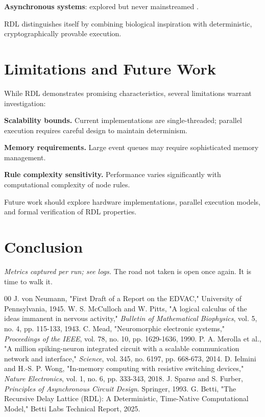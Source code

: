 \documentclass[conference]{IEEEtran}
\begin{document}
\textbf{Asynchronous systems}: explored but never mainstreamed \cite{sparsoe1993}.

RDL distinguishes itself by combining biological inspiration with deterministic, cryptographically provable execution.

\section{Limitations and Future Work}

While RDL demonstrates promising characteristics, several limitations warrant investigation:

\textbf{Scalability bounds.} Current implementations are single-threaded; parallel execution requires careful design to maintain determinism.

\textbf{Memory requirements.} Large event queues may require sophisticated memory management.

\textbf{Rule complexity sensitivity.} Performance varies significantly with computational complexity of node rules.

Future work should explore hardware implementations, parallel execution models, and formal verification of RDL properties.

\section{Conclusion}

\textit{Metrics captured per run; see logs.}\n
The road not taken is open once again. It is time to walk it.

\begin{thebibliography}{00}
 J. von Neumann, "First Draft of a Report on the EDVAC," University of Pennsylvania, 1945.
 W. S. McCulloch and W. Pitts, "A logical calculus of the ideas immanent in nervous activity," \textit{Bulletin of Mathematical Biophysics}, vol. 5, no. 4, pp. 115-133, 1943.
 C. Mead, "Neuromorphic electronic systems," \textit{Proceedings of the IEEE}, vol. 78, no. 10, pp. 1629-1636, 1990.
 P. A. Merolla et al., "A million spiking-neuron integrated circuit with a scalable communication network and interface," \textit{Science}, vol. 345, no. 6197, pp. 668-673, 2014.
 D. Ielmini and H.-S. P. Wong, "In-memory computing with resistive switching devices," \textit{Nature Electronics}, vol. 1, no. 6, pp. 333-343, 2018.
 J. Sparsø and S. Furber, \textit{Principles of Asynchronous Circuit Design}. Springer, 1993.
 G. Betti, "The Recursive Delay Lattice (RDL): A Deterministic, Time-Native Computational Model," Betti Labs Technical Report, 2025.
\end{thebibliography}
\end{document}
